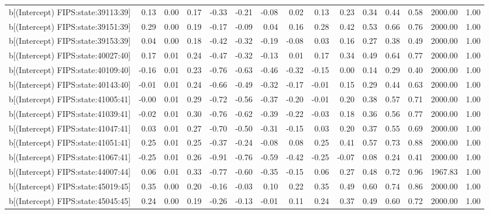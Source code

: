 \begin{table}[ht]
\begin{tabular}{rrrrrrrrrrrrrrr}
  b[(Intercept) FIPS:state:39113:39] & 0.13 & 0.00 & 0.17 & -0.33 & -0.21 & -0.08 & 0.02 & 0.13 & 0.23 & 0.34 & 0.44 & 0.58 & 2000.00 & 1.00 \\ 
  b[(Intercept) FIPS:state:39151:39] & 0.29 & 0.00 & 0.19 & -0.17 & -0.09 & 0.04 & 0.16 & 0.28 & 0.42 & 0.53 & 0.66 & 0.76 & 2000.00 & 1.00 \\ 
  b[(Intercept) FIPS:state:39153:39] & 0.04 & 0.00 & 0.18 & -0.42 & -0.32 & -0.19 & -0.08 & 0.03 & 0.16 & 0.27 & 0.38 & 0.49 & 2000.00 & 1.00 \\ 
  b[(Intercept) FIPS:state:40027:40] & 0.17 & 0.01 & 0.24 & -0.47 & -0.32 & -0.13 & 0.01 & 0.17 & 0.34 & 0.49 & 0.64 & 0.77 & 2000.00 & 1.00 \\ 
  b[(Intercept) FIPS:state:40109:40] & -0.16 & 0.01 & 0.23 & -0.76 & -0.63 & -0.46 & -0.32 & -0.15 & 0.00 & 0.14 & 0.29 & 0.40 & 2000.00 & 1.00 \\ 
  b[(Intercept) FIPS:state:40143:40] & -0.01 & 0.01 & 0.24 & -0.66 & -0.49 & -0.32 & -0.17 & -0.01 & 0.15 & 0.29 & 0.44 & 0.63 & 2000.00 & 1.00 \\ 
  b[(Intercept) FIPS:state:41005:41] & -0.00 & 0.01 & 0.29 & -0.72 & -0.56 & -0.37 & -0.20 & -0.01 & 0.20 & 0.38 & 0.57 & 0.71 & 2000.00 & 1.00 \\ 
  b[(Intercept) FIPS:state:41039:41] & -0.02 & 0.01 & 0.30 & -0.76 & -0.62 & -0.39 & -0.22 & -0.03 & 0.18 & 0.36 & 0.56 & 0.77 & 2000.00 & 1.00 \\ 
  b[(Intercept) FIPS:state:41047:41] & 0.03 & 0.01 & 0.27 & -0.70 & -0.50 & -0.31 & -0.15 & 0.03 & 0.20 & 0.37 & 0.55 & 0.69 & 2000.00 & 1.00 \\ 
  b[(Intercept) FIPS:state:41051:41] & 0.25 & 0.01 & 0.25 & -0.37 & -0.24 & -0.08 & 0.08 & 0.25 & 0.41 & 0.57 & 0.73 & 0.88 & 2000.00 & 1.00 \\ 
  b[(Intercept) FIPS:state:41067:41] & -0.25 & 0.01 & 0.26 & -0.91 & -0.76 & -0.59 & -0.42 & -0.25 & -0.07 & 0.08 & 0.24 & 0.41 & 2000.00 & 1.00 \\ 
  b[(Intercept) FIPS:state:44007:44] & 0.06 & 0.01 & 0.33 & -0.77 & -0.60 & -0.35 & -0.15 & 0.06 & 0.27 & 0.48 & 0.72 & 0.96 & 1967.83 & 1.00 \\ 
  b[(Intercept) FIPS:state:45019:45] & 0.35 & 0.00 & 0.20 & -0.16 & -0.03 & 0.10 & 0.22 & 0.35 & 0.49 & 0.60 & 0.74 & 0.86 & 2000.00 & 1.00 \\ 
  b[(Intercept) FIPS:state:45045:45] & 0.24 & 0.00 & 0.19 & -0.26 & -0.13 & -0.01 & 0.11 & 0.24 & 0.37 & 0.49 & 0.60 & 0.72 & 2000.00 & 1.00 \\ 

\end{tabular}
\end{table}
